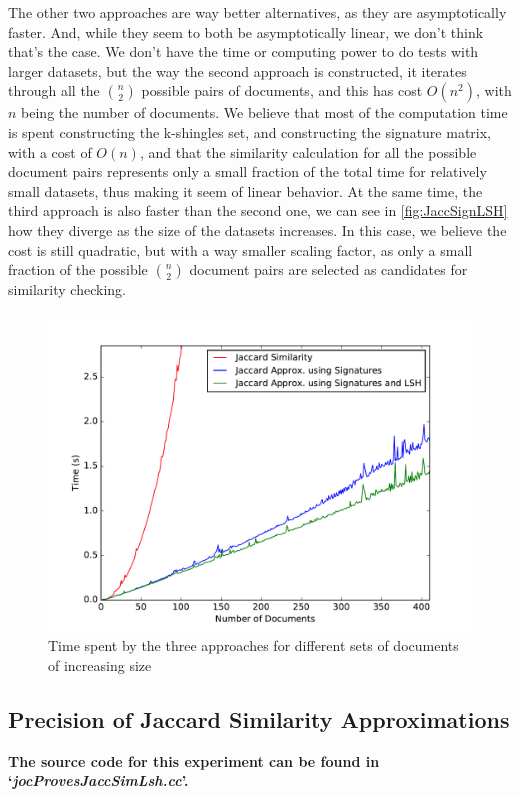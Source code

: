 \documentclass[12pt]{article}
\begin{document}
The other two approaches are way better alternatives, as they are asymptotically faster.
And, while they seem to both be asymptotically linear, we don't think that's the case.
We don't have the time or computing power to do tests with larger datasets, but the way the second approach is constructed, it iterates through all the $\binom{n}{2}$ possible pairs of documents, and this has cost $O(n^2)$, with $n$ being the number of documents. 
We believe that most of the computation time is spent constructing the k-shingles set, and constructing the signature matrix, with a cost of $O(n)$, and that the similarity calculation for all the possible document pairs represents only a small fraction of the total time for relatively small datasets, thus making it seem of linear behavior.
At the same time, the third approach is also faster than the second one, we can see in \autoref{fig:JaccSignLSH} how they diverge as the size of the datasets increases.
In this case, we believe the cost is still quadratic, but with a way smaller scaling factor, as only a small fraction of the possible $\binom{n}{2}$ document pairs are selected as candidates for similarity checking.
\bigskip

\begin{figure}[H]
	\centering
	\includegraphics[scale=0.55]{graphs/JaccardSignatureLSHTimes.pdf}
	\caption{Time spent by the three approaches for different sets of documents of increasing size}
	\label{fig:JaccSignLSH}
\end{figure}

\subsection{Precision of Jaccard Similarity Approximations}
\textbf{The source code for this experiment can be found in `\textit{jocProvesJaccSimLsh.cc}'.}
\medskip
\end{document}
